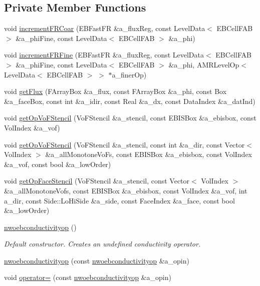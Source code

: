 \subsection*{Private Member Functions}
\begin{DoxyCompactItemize}
\item 
void \hyperlink{classnwoebconductivityop_a16a4bb95c919d674f871c87e3fbf5ed8}{increment\+F\+R\+Coar} (E\+B\+Fast\+FR \&a\+\_\+flux\+Reg, const Level\+Data$<$ E\+B\+Cell\+F\+AB $>$ \&a\+\_\+phi\+Fine, const Level\+Data$<$ E\+B\+Cell\+F\+AB $>$ \&a\+\_\+phi)
\item 
void \hyperlink{classnwoebconductivityop_a3fb5729772b95c997fc1a1bb6e118179}{increment\+F\+R\+Fine} (E\+B\+Fast\+FR \&a\+\_\+flux\+Reg, const Level\+Data$<$ E\+B\+Cell\+F\+AB $>$ \&a\+\_\+phi\+Fine, const Level\+Data$<$ E\+B\+Cell\+F\+AB $>$ \&a\+\_\+phi, A\+M\+R\+Level\+Op$<$ Level\+Data$<$ E\+B\+Cell\+F\+AB $>$ $>$ $\ast$a\+\_\+finer\+Op)
\item 
void \hyperlink{classnwoebconductivityop_a3c61f33f019562b4e8912c161fca0b63}{get\+Flux} (F\+Array\+Box \&a\+\_\+flux, const F\+Array\+Box \&a\+\_\+phi, const Box \&a\+\_\+face\+Box, const int \&a\+\_\+idir, const Real \&a\+\_\+dx, const Data\+Index \&a\+\_\+dat\+Ind)
\item 
void \hyperlink{classnwoebconductivityop_a0143c85bee63c66fde7a0dc1cea93ee2}{get\+Op\+Vo\+F\+Stencil} (Vo\+F\+Stencil \&a\+\_\+stencil, const E\+B\+I\+S\+Box \&a\+\_\+ebisbox, const Vol\+Index \&a\+\_\+vof)
\item 
void \hyperlink{classnwoebconductivityop_ad1ca42e14deff9384ff46ec35e92ca7b}{get\+Op\+Vo\+F\+Stencil} (Vo\+F\+Stencil \&a\+\_\+stencil, const int \&a\+\_\+dir, const Vector$<$ Vol\+Index $>$ \&a\+\_\+all\+Monotone\+Vo\+Fs, const E\+B\+I\+S\+Box \&a\+\_\+ebisbox, const Vol\+Index \&a\+\_\+vof, const bool \&a\+\_\+low\+Order)
\item 
void \hyperlink{classnwoebconductivityop_a66f1524cbe6c1f3ce80df12761ffe449}{get\+Op\+Face\+Stencil} (Vo\+F\+Stencil \&a\+\_\+stencil, const Vector$<$ Vol\+Index $>$ \&a\+\_\+all\+Monotone\+Vofs, const E\+B\+I\+S\+Box \&a\+\_\+ebisbox, const Vol\+Index \&a\+\_\+vof, int a\+\_\+dir, const Side\+::\+Lo\+Hi\+Side \&a\+\_\+side, const Face\+Index \&a\+\_\+face, const bool \&a\+\_\+low\+Order)
\item 
\hyperlink{classnwoebconductivityop_aafe57d3e512b18d6b182126900b58b67}{nwoebconductivityop} ()
\begin{DoxyCompactList}\small\item\em Default constructor. Creates an undefined conductivity operator. \end{DoxyCompactList}\item 
\hyperlink{classnwoebconductivityop_a5be74b54251d05162bf954e5512bd1b1}{nwoebconductivityop} (const \hyperlink{classnwoebconductivityop}{nwoebconductivityop} \&a\+\_\+opin)
\item 
void \hyperlink{classnwoebconductivityop_a2075cdc47b4d629c31bdef9795187979}{operator=} (const \hyperlink{classnwoebconductivityop}{nwoebconductivityop} \&a\+\_\+opin)
\end{DoxyCompactItemize}


